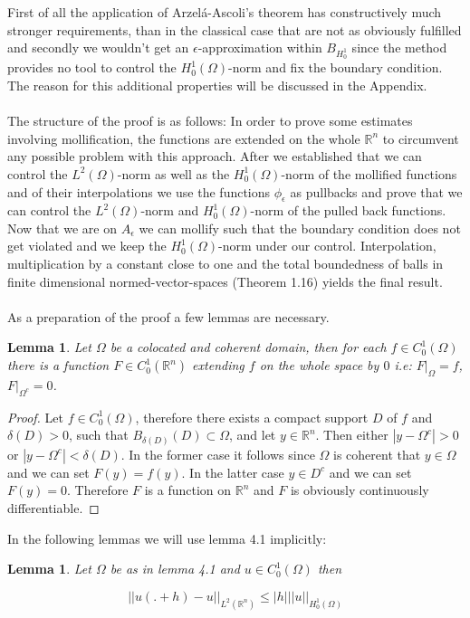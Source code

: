 \documentclass[11pt,a4paper,leqno]{report}
\newtheorem{lemma}[theorem]{Lemma}
\numberwithin{equation}{chapter}
\begin{document}
First of all the application of Arzel\'{a}-Ascoli's theorem has constructively much stronger requirements, than in the classical case that are not as obviously fulfilled and secondly we wouldn't get an $\epsilon$-approximation within $B_{H^1_0}$ since the method provides no tool to control the $H^1_0(\Omega)$-norm and fix the boundary condition. The reason for this additional properties will be discussed in the Appendix.
\\
\\
The structure of the proof is as follows: In order to prove some estimates involving mollification, the functions are extended on the whole $\mathbb{R}^n$ to circumvent any possible problem with this approach. After we established that we can control the $L^2(\Omega)$-norm as well as the $H^1_0(\Omega)$-norm of the mollified functions and of their interpolations we use the functions $\phi_\epsilon$
as pullbacks and prove that we can control the $L^2(\Omega)$-norm and $H^1_0(\Omega)$-norm of the pulled back functions. Now that we are on $A_\epsilon$ we can mollify such that the boundary condition does not get violated and we keep the $H^1_0(\Omega)$-norm under our control. Interpolation, multiplication by a constant close to one and the total boundedness of balls in finite dimensional normed-vector-spaces (Theorem 1.16) yields the final result.
\\
\\
As a preparation of the proof a few lemmas are necessary.
\begin{lemma} Let $\Omega$ be a colocated and coherent domain, then for each $f\in C^1_0(\Omega)$ there is a function $F\in C^1_0(\mathbb{R}^n)$ extending $f$ on the whole space by $0$ i.e: $F|_\Omega=f$, $F|_{\Omega^c}=0$.\end{lemma}
\begin{proof} Let $f\in C^1_0(\Omega)$, therefore there exists a compact support $D$ of $f$ and $\delta(D)>0$, such that $B_{\delta(D)}(D)\subset \Omega$, and let $y\in\mathbb{R}^n$. Then either $|y-\Omega^c|>0$ or $|y-\Omega^c|<\delta(D)$. In the former case it follows since $\Omega$ is coherent that $y\in\Omega$ and we can set $F(y)=f(y)$. In the latter case $y\in D^c$ and we can set $F(y)=0$. Therefore $F$ is a function on $\mathbb{R}^n$ and $F$ is obviously continuously differentiable.
\end{proof}
In the following lemmas we will use lemma 4.1 implicitly:
\begin{lemma} Let $\Omega$ be as in lemma 4.1 and $u\in C^1_0(\Omega)$ then \begin{small}\begin{equation}||u(.+h)-u||_{L^2(\mathbb{R}^n)}\leq|h|||u||_{H^1_0(\Omega)}\end{equation}\end{small}\end{lemma}
\end{document}
